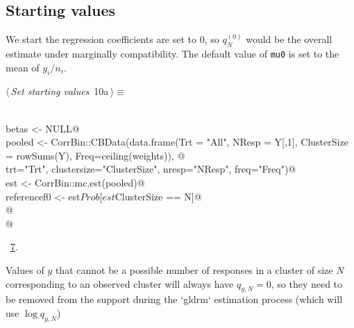 \documentclass[reqno]{amsart}
\renewcommand{\NWtarget}[2]{\hypertarget{#1}{#2}}
\renewcommand{\NWlink}[2]{\hyperlink{#1}{#2}}
\begin{document}
\subsection{Starting values}
We start the regression coefficients are set to 0, so $q^{(0)}_N$ would be the overall estimate under marginally compatibility. The default value of \texttt{mu0} is set to the mean of $y_i/n_i$.

\begin{flushleft} \small\label{scrap11}\raggedright\small
\NWtarget{nuweb10a}{} $\langle\,${\itshape Set starting values}\nobreak\ {\footnotesize {10a}}$\,\rangle\equiv$
\vspace{-1ex}
\begin{list}{}{} \item
\mbox{}\verb@@\\
\mbox{}\verb@  betas <- NULL@\\
\mbox{}\verb@  pooled <- CorrBin::CBData(data.frame(Trt = "All", NResp = Y[,1], ClusterSize = rowSums(Y), Freq=ceiling(weights)), @\\
\mbox{}\verb@                    trt="Trt", clustersize="ClusterSize", nresp="NResp", freq="Freq")@\\
\mbox{}\verb@  est <- CorrBin::mc.est(pooled)@\\
\mbox{}\verb@  referencef0 <- est$Prob[est$ClusterSize == N]@\\
\mbox{}\verb@  @\\
\mbox{}\verb@  @\\
\mbox{}\verb@@{\NWsep}
\end{list}
\vspace{-1.5ex}
\footnotesize
\begin{list}{}{\setlength{\itemsep}{-\parsep}\setlength{\itemindent}{-\leftmargin}}
\item \NWtxtMacroRefIn\ \NWlink{nuweb7}{7}.

\item{}
\end{list}
\vspace{4ex}
\end{flushleft}
Values of $y$ that cannot be a possible number of responses in a cluster of size $N$ corresponding to an observed cluster will always have $q_{y,N}=0$, so they need to be removed from the support during the `gldrm` estimation process (which will use $\log q_{y,N}$)
\end{document}

